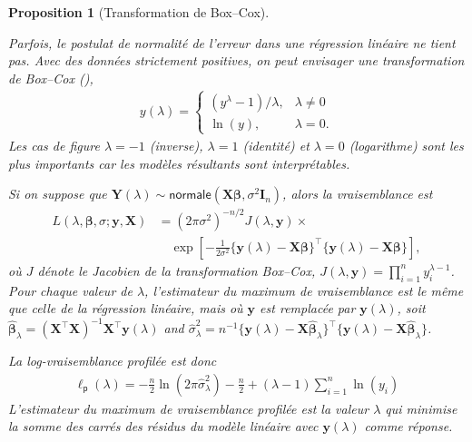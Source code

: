 \documentclass[
  11pt,
  letterpaper,
]{scrbook}
\theoremstyle{definition}
\theoremstyle{plain}
\newtheorem{proposition}{Proposition}[chapter]
\theoremstyle{definition}
\theoremstyle{plain}
\theoremstyle{remark}
\begin{document}
\begin{proposition}[Transformation de
Box--Cox]\protect\hypertarget{prp-boxcox}{}\label{prp-boxcox}

Parfois, le postulat de normalité de l'erreur dans une régression
linéaire ne tient pas. Avec des données strictement positives, on peut
envisager une transformation de Box--Cox
(), \begin{align*}
y(\lambda)= \begin{cases}
(y^{\lambda}-1)/\lambda, & \lambda \neq 0\\
\ln(y), & \lambda=0.
\end{cases}
\end{align*} Les cas de figure \(\lambda=-1\) (inverse), \(\lambda=1\)
(identité) et \(\lambda=0\) (logarithme) sont les plus importants car
les modèles résultants sont interprétables.

Si on suppose que
\(\boldsymbol{Y}(\lambda) \sim \mathsf{normale}(\mathbf{X}\boldsymbol{\beta}, \sigma^2 \mathbf{I}_n)\),
alors la vraisemblance est \begin{align*}
L(\lambda, \boldsymbol{\beta}, \sigma; \boldsymbol{y}, \mathbf{X}) &= (2\pi\sigma^2)^{-n/2} J(\lambda, \boldsymbol{y}) \times\\& \quad \exp \left[ - \frac{1}{2\sigma^2}\{\boldsymbol{y}(\lambda) - \mathbf{X}\boldsymbol{\beta}\}^\top\{\boldsymbol{y}(\lambda) - \mathbf{X}\boldsymbol{\beta}\}\right],
\end{align*} où \(J\) dénote le Jacobien de la transformation Box--Cox,
\(J(\lambda, \boldsymbol{y})=\prod_{i=1}^n y_i^{\lambda-1}\). Pour
chaque valeur de \(\lambda\), l'estimateur du maximum de vraisemblance
est le même que celle de la régression linéaire, mais où
\(\boldsymbol{y}\) est remplacée par \(\boldsymbol{y}(\lambda)\), soit
\(\widehat{\boldsymbol{\beta}}_\lambda = (\mathbf{X}^\top\mathbf{X})^{-1}\mathbf{X}^\top \boldsymbol{y}(\lambda)\)
and
\(\widehat{\sigma}^2_\lambda = n^{-1}\{ \boldsymbol{y}(\lambda) - \mathbf{X}\widehat{\boldsymbol{\beta}}_\lambda\}^\top\{ \boldsymbol{y}(\lambda) - \mathbf{X}\widehat{\boldsymbol{\beta}}_\lambda\}\).

La log-vraisemblance profilée est donc \begin{align*}
\ell_{\mathsf{p}}(\lambda) = -\frac{n}{2}\ln(2\pi \widehat{\sigma}^2_\lambda) - \frac{n}{2} + (\lambda - 1)\sum_{i=1}^n \ln(y_i)
\end{align*} L'estimateur du maximum de vraisemblance profilée est la
valeur \(\lambda\) qui minimise la somme des carrés des résidus du
modèle linéaire avec \(\boldsymbol{y}(\lambda)\) comme réponse.


\end{proposition}
\end{document}
